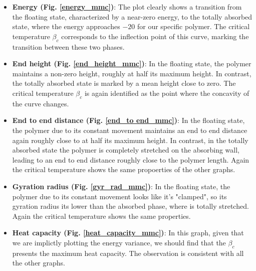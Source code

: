 \begin{itemize}
    \item \textbf{Energy (Fig. \ref{energy_mmc})}: The plot clearly shows a transition from the floating state, characterized by a 
    near-zero energy, to the totally absorbed state, where the energy approaches $-20$ for our specific polymer. 
    The critical temperature $\beta_c$ corresponds to the inflection point of this curve, marking the transition between these 
    two phases.
    
    \item \textbf{End height (Fig. \ref{end_height_mmc})}: In the floating state, the polymer maintains a non-zero height, roughly 
    at half its maximum height. In contrast, the totally absorbed state is marked by a mean height close to zero. The critical 
    temperature $\beta_c$ is again identified as the point where the concavity of the curve changes.

    \item \textbf{End to end distance (Fig. \ref{end_to end_mmc})}: In the floating state, the polymer due to its constant movement 
    maintains an end to end distance again roughly close to at half its maximum height. In contrast, in the totally absorbed state the polymer 
    is completely stretched on the absorbing wall, leading to an end to end distance roughly close to the polymer length. 
    Again the critical temperature shows the same propoerties of the other graphs.

    \item \textbf{Gyration radius (Fig. \ref{gyr_rad_mmc})}: In the floating state, the polymer due to its constant movement looks like it's
    "clamped", so its gyration radius its lower than the absorbed phase, where is totally stretched. 
    Again the critical temperature shows the same properties.

    \item \textbf{Heat capacity (Fig. \ref{heat_capacity_mmc})}: In this graph, given that we are implictly plotting the energy variance, we should find 
    that the $\beta_c$ presents the maximum heat capacity. The observation is consistent with all the other graphs.

\end{itemize}
